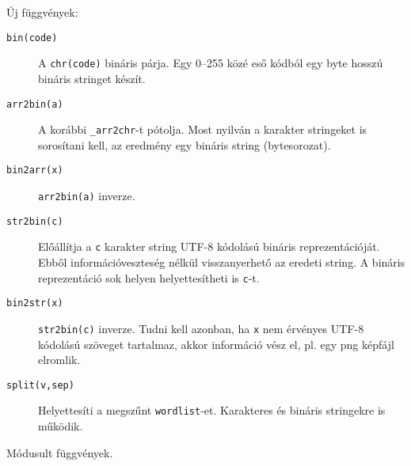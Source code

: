 Új függvények:
\begin{description}
\item[{\tt bin(code)}]
    A \verb!chr(code)! bináris párja. Egy 0--255 közé eső
    kódból egy byte hosszú bináris stringet készít.
\item[{\tt arr2bin(a)}]
    A korábbi \verb!_arr2chr!-t pótolja. Most nyilván a karakter
    stringeket is sorosítani kell, az eredmény egy bináris string
    (bytesorozat).
\item[{\tt bin2arr(x)}]
    \verb!arr2bin(a)! inverze.
\item[{\tt str2bin(c)}]
    Előállítja a \verb!c! karakter string UTF-8 kódolású bináris
    reprezentációját. Ebből információveszteség nélkül visszanyerhető
    az eredeti string. A bináris reprezentáció sok helyen helyettesítheti
    is \verb!c!-t.
\item[{\tt bin2str(x)}]
    \verb!str2bin(c)! inverze. Tudni kell azonban,  ha \verb!x!
    nem érvényes UTF-8 kódolású szöveget tartalmaz, akkor információ
    vész el, pl. egy png képfájl elromlik.
\item[{\tt split(v,sep)}]
    Helyettesíti a megszűnt \verb!wordlist!-et.
    Karakteres és bináris stringekre is működik.
\end{description}

Módusult függvények.

